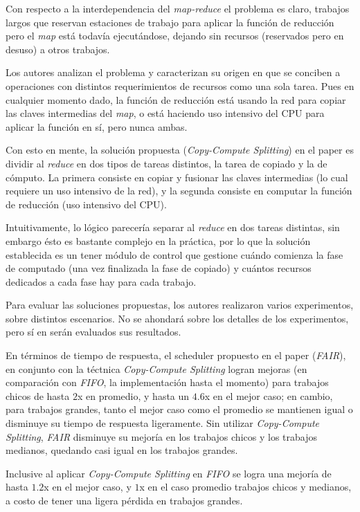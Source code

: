 \documentclass[a4paper]{article}
\begin{document}
Con respecto a la interdependencia del \textit{map-reduce} el problema es
claro, trabajos largos que reservan estaciones de trabajo para
aplicar la función de reducción pero el \textit{map} está todavía
ejecutándose, dejando sin recursos (reservados pero en desuso) a otros
trabajos.

Los autores analizan el problema y caracterizan su origen en que se conciben a
operaciones con distintos requerimientos de recursos como una sola tarea. Pues
en cualquier momento dado, la función de reducción está usando la red para
copiar las claves intermedias del \textit{map}, o está haciendo uso intensivo
del CPU para aplicar la función en sí, pero nunca ambas.

Con esto en mente, la solución propuesta (\textit{Copy-Compute Splitting}) en el paper es dividir al
\textit{reduce} en dos tipos de tareas distintos, la tarea de copiado y la de
cómputo. La primera consiste en copiar y fusionar las claves intermedias (lo
cual requiere un uso intensivo de la red), y la segunda consiste en computar la
función de reducción (uso intensivo del CPU).

Intuitivamente, lo lógico parecería separar al \textit{reduce} en dos tareas
distintas, sin embargo ésto es bastante complejo en la práctica, por lo que la
solución establecida es un tener módulo de control que gestione cuándo comienza la fase
de computado (una vez finalizada la fase de copiado) y cuántos recursos
dedicados a cada fase hay para cada trabajo.

Para evaluar las soluciones propuestas, los autores realizaron varios
experimentos, sobre distintos escenarios. No se ahondará sobre los detalles de
los experimentos, pero sí en serán evaluados sus resultados.

En términos de tiempo de respuesta, el scheduler propuesto en el paper
(\textit{FAIR}), en conjunto con la téctnica \textit{Copy-Compute Splitting} 
logran mejoras (en comparación con \textit{FIFO}, la implementación hasta el
momento) para trabajos chicos de hasta $2$x en 
promedio, y hasta un $4.6$x en el mejor caso; en cambio, para trabajos grandes,
tanto el mejor caso como el promedio se mantienen igual o disminuye su
tiempo de respuesta ligeramente. Sin utilizar \textit{Copy-Compute Splitting},
\textit{FAIR}  disminuye su mejoría en los trabajos chicos y los trabajos 
medianos, quedando casi igual en los trabajos grandes.

Inclusive al aplicar \textit{Copy-Compute Splitting} en \textit{FIFO} se logra
una mejoría de hasta $1.2$x en el mejor caso, y $1$x en el caso promedio
trabajos chicos y medianos, a costo de tener una ligera pérdida en trabajos
grandes.
\end{document}
